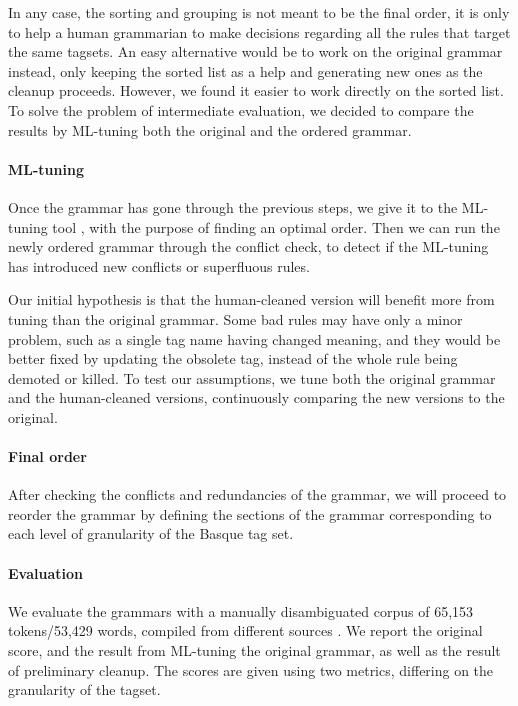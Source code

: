{{In any case, the sorting and grouping is not meant to be the final order, it is only 
to help a human grammarian to make decisions regarding all the rules that 
target the same tagsets.
An easy alternative would be to work on the original grammar instead, only
keeping the sorted list as a help and generating new ones as the
cleanup proceeds. However, we found it easier to work directly on the
sorted list. To solve the problem of intermediate evaluation, we
decided to compare the results by ML-tuning both the original and the
ordered grammar.

\paragraph{ML-tuning}
Once the grammar has gone through the previous steps, we give it to the 
ML-tuning tool \cite{bick2013tuning}, with the purpose of finding an 
optimal order. Then we can run the newly ordered grammar through the
conflict check, to detect if the ML-tuning has introduced new
conflicts or superfluous rules.

Our initial hypothesis is that the human-cleaned version will benefit more 
from tuning than the original grammar. Some bad rules may have only a minor 
problem, such as a single tag name having changed meaning, and they would be 
better fixed by updating the obsolete tag, instead of the whole rule being 
demoted or killed. To test our assumptions, we tune both the original
grammar and the human-cleaned versions, continuously comparing the new
versions to the original.

\paragraph{Final order}

After checking the conflicts and redundancies of the grammar, 
we will proceed to reorder the grammar by defining the sections
of the grammar corresponding to each level of granularity of the Basque tag set.


\paragraph{Evaluation}

We evaluate the grammars with a manually disambiguated corpus of 65,153 tokens/53,429 words,
compiled from different sources \cite{aduriz2006epec}.
We report the original score, and the result from ML-tuning the original grammar, 
as well as the result of preliminary cleanup. 
The scores are given using two metrics, differing on the granularity of the tagset.

}}

